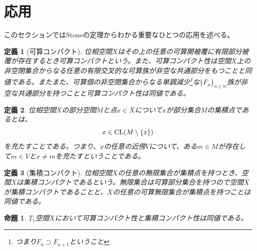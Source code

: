 \documentclass{jsarticle}
\newtheorem{proposition}[theorem]{命題}
\newtheorem{df}{定義}
\newcommand{\cl}{\text{{\rm CL}}}
\begin{document}
\section{応用}
このセクションではStoneの定理からわかる重要なひとつの応用を述べる。
\begin{df}[可算コンパクト]
位相空間$X$はその上の任意の可算開被覆に有限部分被覆が存在するとき可算コンパクトという。また、可算コンパクト性は空間$X$上の非空閉集合からなる任意の有限交叉的な可算族が非空な共通部分をもつことと同値である。またまた、可算個の非空閉集合からなる単調減少\footnote{つまり$F_{n}\supset F_{n+1}$ということ}な$\{F_n\}_{n\in \mathbb{N}}$族が非空な共通部分を持つことと可算コンパクト性は同値である。
\end{df}
\begin{df}
位相空間$X$の部分空間$M$と点$x\in X$について$x$が部分集合$M$の集積点であるとは、
\[
x\in \cl(M\setminus\{x\})
\]
を充たすことである。つまり、$x$の任意の近傍$V$について、ある$m\in M$が存在して$m\in V$と$x\neq m$を充たすということである。
\end{df}
\begin{df}[集積コンパクト]
位相空間$X$の任意の無限集合が集積点を持つとき、空間$X$は集積コンパクトであるという。無限集合は可算部分集合を持つので空間$X$が集積コンパクトであることと、$X$の任意の可算無限集合が集積点を持つことは同値である。
\end{df}
\begin{proposition}
$T_1$空間$X$において可算コンパクト性と集積コンパクト性は同値である。
\end{proposition}
\end{document}
